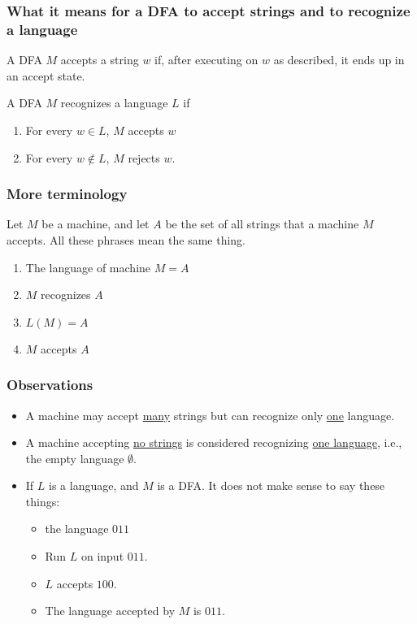 \documentclass[xcolor=table]{beamer}
\begin{document}
\begin{frame}
  \frametitle{What it means for a DFA to accept strings and to
  recognize a language}

  \begin{Definition}
    A DFA \alert{$M$ accepts a string} $w$ if, after executing on $w$
      as described, it ends up in an accept state.
  \end{Definition}

  \begin{Definition}
    A DFA \alert{$M$ recognizes a language} $L$ if
    \begin{enumerate}
    \item For every $w\in L$, $M$ accepts $w$
    \item For every $w\not\in L$, $M$ rejects $w$.
    \end{enumerate}
  \end{Definition}
\end{frame}


\begin{frame}
  \frametitle{More terminology}

  Let $M$ be a machine, and let $A$ be the set of all strings that a
  machine $M$ accepts. All these phrases mean the same thing.

  \begin{enumerate}
    \item The \alert{language} of machine $M = A$
    \item $M$ \alert{recognizes} $A$
    \item $L(M) = A$
    \item $M$ \alert{accepts} $A$
  \end{enumerate}

\end{frame}


\begin{frame}
  \frametitle{Observations}

  \begin{itemize}
    \item A machine may accept \underline{many} strings but can recognize only \underline{one}
      language.
      \bigskip

    \item A machine accepting \underline{no strings} is considered recognizing \underline{one
    language}, i.e., the empty language $\emptyset$.
      \bigskip

    \item If $L$ is a language, and $M$ is a DFA. It \alert{does
      not make sense} to say these things:
      \begin{itemize}
	\item the language $011$
	\item Run $L$ on input $011$.
	\item $L$ accepts $100$.
	\item The language accepted by $M$ is $011$.
      \end{itemize}
  \end{itemize}
\end{frame}
\end{document}
